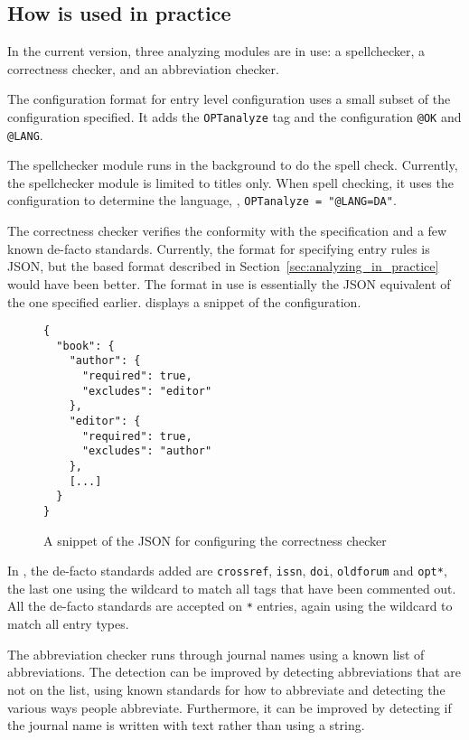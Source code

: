 \subsection{How {\orangutan} is used in practice}

In the current version, three analyzing modules are in use: a
spellchecker, a correctness checker, and an abbreviation checker.

The configuration format for entry level configuration uses a small
subset of the configuration specified.  It adds the
\texttt{OPTanalyze} tag and the configuration \texttt{@OK} and
\texttt{@LANG}.

The spellchecker module runs  in the background to do
the spell check.  Currently, the spellchecker module is limited to
titles only.  When spell checking, it uses the configuration to
determine the language, \eg, \texttt{OPTanalyze = "@LANG=DA"}.

The correctness checker verifies the conformity with the {\bibtex}
specification and a few known de-facto standards.  Currently, the
format for specifying entry rules is JSON, but the {\bibtex} based
format described in Section~\ref{sec:analyzing_in_practice} would have
been better.  The format in use is essentially the JSON equivalent of
the one specified earlier.  
displays a snippet of the configuration.

\begin{figure}
  \centering
\begin{verbatim}
{
  "book": {
    "author": {
      "required": true,
      "excludes": "editor"
    },
    "editor": {
      "required": true,
      "excludes": "author"
    },
    [...]
  }
}
\end{verbatim}
\caption{A snippet of the JSON for configuring the correctness checker}
\label{fig:correctness_checker_json}
\end{figure}

In {\orangutan}, the de-facto standards added are \texttt{crossref},
\texttt{issn}, \texttt{doi}, \texttt{oldforum} and \texttt{opt*}, the
last one using the wildcard to match all tags that have been commented
out.  All the de-facto standards are accepted on \texttt{*} entries,
again using the wildcard to match all entry types.

The abbreviation checker runs through journal names using a known list
of abbreviations.  The detection can be improved by detecting
abbreviations that are not on the list, using known standards for how
to abbreviate and detecting the various ways people abbreviate.
Furthermore, it can be improved by detecting if the journal name is
written with text rather than using a {\bibtex} string.


